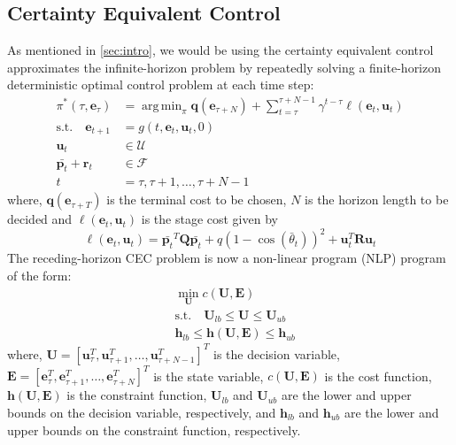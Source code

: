 \documentclass[conference]{IEEEtran}
\DeclareMathOperator*{\argmin}{arg\,min}
\begin{document}
\subsection{Certainty Equivalent Control} \label{sec:ce}
As mentioned in \ref{sec:intro}, we would be using the certainty equivalent control approximates the infinite-horizon problem by repeatedly solving a finite-horizon deterministic optimal control problem at each time step:
\begin{align}
    \pi^*(\tau, \mathbf{e}_\tau) &= \argmin_{\pi} \mathbf{q}(\mathbf{e}_{\tau + N}) + \sum_{t=\tau}^{\tau+N-1} \gamma^{t-\tau} \ell(\mathbf{e}_t, \mathbf{u}_t) \\
    \text{s.t.} \quad \mathbf{e}_{t+1} &= g(t, \mathbf{e}_t, \mathbf{u}_t, 0) \\
    \mathbf{u}_t &\in \mathcal{U} \\
    \bar{\mathbf{p}_t} + \mathbf{r}_t &\in \mathcal{F} \\
    t &= \tau, \tau+1, \dots, \tau+N-1
\end{align}
where, $\mathbf{q}(\mathbf{e}_{\tau + T})$ is the terminal cost to be chosen, $N$ is the horizon length to be decided and $\ell(\mathbf{e}_t, \mathbf{u}_t)$ is the stage cost given by
\begin{equation}
    \ell(\mathbf{e}_t, \mathbf{u}_t) = \bar{\mathbf{p}_t}^{T} \mathbf{Q} \bar{\mathbf{p}_t} + q(1 -\cos(\bar{\theta}_t))^2 + \mathbf{u}_t^T \mathbf{R} \mathbf{u}_t
\end{equation}
The receding-horizon CEC problem is now a non-linear program (NLP) program of the form:
\begin{align}
    & \min_{\mathbf{U}} c(\mathbf{U}, \mathbf{E}) \\
    & \text{s.t.} \quad \mathbf{U}_{lb} \leq \mathbf{U} \leq \mathbf{U}_{ub} \\
    & \mathbf{h}_{lb} \leq \mathbf{h}(\mathbf{U}, \mathbf{E}) \leq \mathbf{h}_{ub}
\end{align}
where, $\mathbf{U} = [\mathbf{u}_\tau^T, \mathbf{u}_{\tau+1}^T, \dots, \mathbf{u}_{\tau+N-1}^T]^T$ is the decision variable, $\mathbf{E} = [\mathbf{e}_\tau^T, \mathbf{e}_{\tau+1}^T, \dots, \mathbf{e}_{\tau+N}^T]^T$ is the state variable, $c(\mathbf{U}, \mathbf{E})$ is the cost function, $\mathbf{h}(\mathbf{U}, \mathbf{E})$ is the constraint function, $\mathbf{U}_{lb}$ and $\mathbf{U}_{ub}$ are the lower and upper bounds on the decision variable, respectively, and $\mathbf{h}_{lb}$ and $\mathbf{h}_{ub}$ are the lower and upper bounds on the constraint function, respectively.
\end{document}
